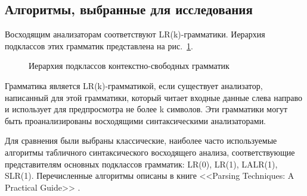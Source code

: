\documentclass[14pt]{matmex-diploma}
\begin{document}
\subsection{Алгоритмы, выбранные для исследования}

Восходящим анализаторам соответствуют LR(k)-грамматики. Иерархия подклассов этих грамматик представлена на рис.~\ref{lr_huerarchy}.

\begin{figure}[h]
\caption{Иерархия подклассов контекстно-свободных грамматик \cite{grammar_type_recognition}}
\label{lr_huerarchy}
\end{figure}

Грамматика является LR(k)-грамматикой, если существует анализатор, написанный для этой грамматики, который читает входные данные слева направо и использует для предпросмотра не более k символов. Эти грамматики могут быть проанализированы восходящими синтаксическими анализаторами.

Для сравнения были выбраны классические, наиболее часто используемые алгоритмы табличного синтаксического восходящего анализа, соответствующие представителям основных подклассов грамматик: LR(0), LR(1), LALR(1), SLR(1). Перечисленные алгоритмы описаны в книге <<Parsing Techniques: A Practical Guide>> \cite{book:grune}. 
\end{document}
